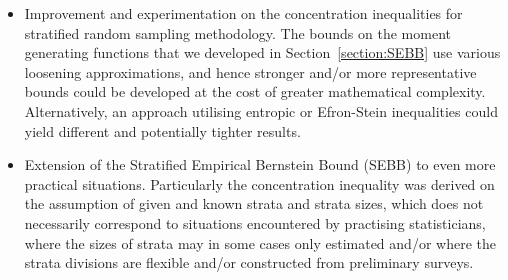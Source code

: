 \begin{itemize}
\item	Improvement and experimentation on the concentration inequalities for stratified random sampling methodology. The bounds on the moment generating functions that we developed in Section~\ref{section:SEBB} use various loosening approximations, and hence stronger and/or more representative bounds could be developed at the cost of greater mathematical complexity.
Alternatively, an approach utilising entropic \citep{Boucheron_concentrationinequalities} or Efron-Stein inequalities \citep{efron1981} could yield different and potentially tighter results.
\item	Extension of the Stratified Empirical Bernstein Bound (SEBB) to even more practical situations. Particularly the concentration inequality was derived on the assumption of given and known strata and strata sizes, which does not necessarily correspond to situations encountered by practising statisticians, where the sizes of strata may in some cases only estimated and/or where the strata divisions are flexible and/or constructed from preliminary surveys.
\end{itemize}





